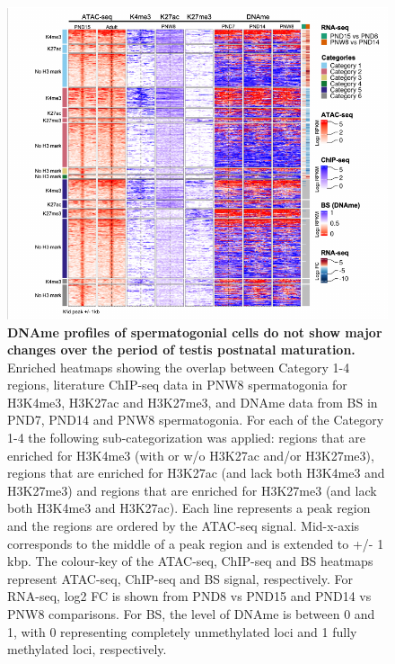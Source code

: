\documentclass[12pt,twoside]{reedthesis}
\begin{document}
\begin{figure}[H]

{\centering \includegraphics{thesis_files/figure-latex/ds4-1} 

}

\caption[DNAme profiles of spermatogonial cells do not show major changes over the period of testis postnatal maturation]{\textbf{DNAme profiles of spermatogonial cells do not show major changes over the period of testis postnatal maturation.} Enriched heatmaps showing the overlap between Category 1-4 regions, literature ChIP-seq data in PNW8 spermatogonia for H3K4me3, H3K27ac and H3K27me3, and DNAme data from BS in PND7, PND14 and PNW8 spermatogonia. For each of the Category 1-4 the following sub-categorization was applied: regions that are enriched for H3K4me3 (with or w/o H3K27ac and/or H3K27me3), regions that are enriched for H3K27ac (and lack both H3K4me3 and H3K27me3) and regions that are enriched for H3K27me3 (and lack both H3K4me3 and H3K27ac). Each line represents a peak region and the regions are ordered by the ATAC-seq signal. Mid-x-axis corresponds to the middle of a peak region and is extended to +/- 1 kbp. The colour-key of the ATAC-seq, ChIP-seq and BS heatmaps represent ATAC-seq, ChIP-seq and BS signal, respectively. For RNA-seq, log2 FC is shown from PND8 vs PND15 and PND14 vs PNW8 comparisons. For BS, the level of DNAme is between 0 and 1, with 0 representing completely unmethylated loci and 1 fully methylated loci, respectively.}\label{fig:ds4}
\end{figure}
\end{document}
